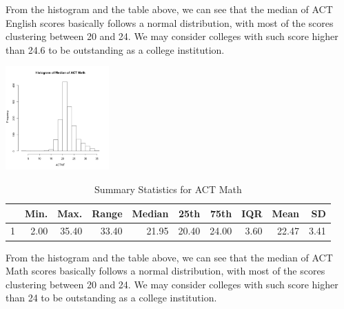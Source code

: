 \documentclass{article}\usepackage[]{graphicx}\usepackage[]{color}
\begin{document}
From the histogram and the table above, we can see that the median of ACT English scores basically follows a normal distribution, with most of the scores clustering between 20 and 24. We may consider colleges with such score higher than 24.6 to be outstanding as a college institution.



{\centering \includegraphics[width=150px]{../images/histogram-ACTMTMedian} 

}


\begin{table}[ht]
\centering
\begin{tabular}{rrrrrrrrrr}
  \hline
 & Min. & Max. & Range & Median & 25th & 75th & IQR & Mean & SD \\ 
  \hline
1 & 2.00 & 35.40 & 33.40 & 21.95 & 20.40 & 24.00 & 3.60 & 22.47 & 3.41 \\ 
   \hline
\end{tabular}
\caption{Summary Statistics for ACT Math} 
\end{table}


From the histogram and the table above, we can see that the median of ACT Math scores basically follows a normal distribution, with most of the scores clustering between 20 and 24. We may consider colleges with such score higher than 24 to be outstanding as a college institution.
\end{document}
